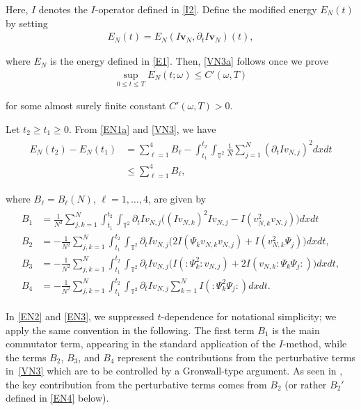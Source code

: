 \documentclass[letterpaper, 11pt,  reqno]{amsart}
\newcommand{\1}{\hspace{0.5mm}\text{I}\hspace{0.2mm}}
\newcommand{\noi}{\noindent}
\newcommand{\T}{\mathbb{T}}
\newcommand{\dt}{\partial_t}
\newcommand{\EN}{E_N}
\newcommand{\wick}[1]{:\!{#1}\!:}
\newcommand{\vv}{\mathbf{v}}
\renewcommand{\o}{\omega}
\renewcommand{\l}{\ell}
\numberwithin{equation}{section}
\numberwithin{theorem}{section}
\begin{document}
\noi
Here, $I$ denotes the $I$-operator  defined in \eqref{I2}.
Define
the  modified energy $\EN (t)$ by setting
\begin{align}
\EN (t) 
 =  \EN (I \vv_N, \dt I \vv_N) (t), 
\label{EN1a}
\end{align}

\noi
where  $E_N$ is the energy defined in \eqref{E1}.
Then, \eqref{VN3a} follows once we prove
\begin{align*}
\sup_{0 \le t \le T}
\EN(t; \o) \le C'(\o, T) 
\end{align*}

\noi
for some almost surely finite constant $C'(\o, T)> 0$.



Let  $t_2\ge t_1 \ge 0$.
From \eqref{EN1a} and \eqref{VN3},  we have
\begin{align}
\begin{split}
\EN (t_2) - \EN (t_1) 
& = \sum_{\l = 1}^4 B_\l
- \int_{t_1}^{t_2} \int_{\T^2} \frac 1N \sum_{j=1}^{N} ( \dt  I v_{N,j} )^2 d x d t  \\
& \le  \sum_{\l = 1}^4 B_\l, 
\end{split}
\label{EN2}
\end{align} 


\noi
where $B_\l = B_\l(N)$, $\l = 1, \dots, 4$, 
are given by 
\begin{align}
\begin{split}
B_1 & = 
 \frac{1}{N^2} \sum_{j, k =1}^{N}
\int_{t_1}^{t_2} \int_{\T^2}
 \dt I v_{N,j}  \Big( ( I v_{N,k} )^2 I v_{N,j} 
- I (  v_{N,k} ^2 v_{N,j} ) \Big) d x d t  \\
B_2 & =  - 
 \frac{1}{N^2} \sum_{j, k =1}^{N}
\int_{t_1}^{t_2} \int_{\T^2}  \dt I v_{N,j}
 \Big(  2 I ( \Psi_k v_{N,k} v_{N,j} ) 
 + I (  v_{N,k} ^2 \Psi_j )\Big) d x d t, \\
B_3 & =  - \frac{1}{N^2} \sum_{j, k =1}^{N}
\int_{t_1}^{t_2} \int_{\T^2}  \dt I v_{N,j}   \Big( I ( \wick{ \Psi_k^2 } v_{N,j} ) 
+ 2 I ( v_{N,k} \wick{ \Psi_k \Psi_j } ) \Big) d x d t, \\
B_4 & =  - 
 \frac{1}{N^2} \sum_{j, k =1}^{N}
\int_{t_1}^{t_2} \int_{\T^2} \dt I v_{N,j}  \sum_{k=1}^{N} 
I ( \wick{ \Psi_k^2 \Psi_j } ) d x d t.
\end{split}
\label{EN3}
\end{align} 



\noi
In \eqref{EN2} and \eqref{EN3}, we suppressed
$t$-dependence for notational simplicity;
 we apply the same convention in the following.
The first term $B_1$ is the main commutator term, appearing
in the standard application of the $I$-method, 
while the terms $B_2$, $B_3$, and $B_4$
represent the contributions from the perturbative terms 
in~\eqref{VN3}
which are to be controlled 
by a Gronwall-type argument.
As seen in \cite{GKOT}, 
the key contribution from the perturbative terms
comes from $B_2$
(or rather $B_2'$ defined in \eqref{EN4} below).
\end{document}
